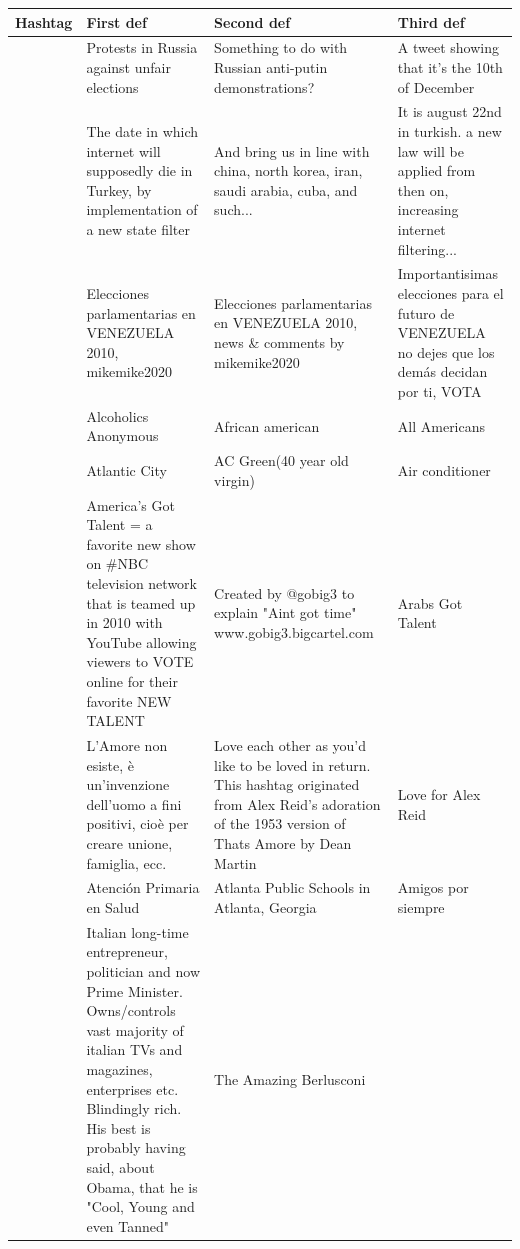 \documentclass[a4paper,11pt,oneside]{article}
\begin{document}
\begin{table}[h]
\label{tab:hashDef}
\centering
    \begin{tabular}{ | l | p{4cm} | p{4cm} | p{4cm} |}
    \hline
Hashtag & First def & Second def & Third def \\ \hline
\raisebox{-1mm}{10dec} & \small{Protests in Russia against unfair elections} & \small{Something to do with Russian anti-putin demonstrations?} & \small{A tweet showing that it's the 10th of December}\\
\raisebox{-1mm}{22agustos} & \small{The date in which internet will supposedly die in Turkey, by implementation of a new state filter} & \small{And bring us in line with china, north korea, iran, saudi arabia, cuba, and such...} & \small{It is august 22nd in turkish. a new law will be applied from then on, increasing internet filtering...}\\
\raisebox{-1mm}{26s} & \small{Elecciones parlamentarias en VENEZUELA 2010, mikemike2020} & \small{Elecciones parlamentarias en VENEZUELA 2010, news \& comments by mikemike2020} & \small{Importantisimas elecciones para el futuro de VENEZUELA no dejes que los demás decidan por ti, VOTA}\\
\raisebox{-1mm}{aa} & \small{Alcoholics Anonymous} & \small{African american } & \small{All Americans}\\
\raisebox{-1mm}{ac} & \small{Atlantic City} & \small{AC Green(40 year old virgin)} &  \small{Air conditioner}\\
\raisebox{-1mm}{agt} & \small{America's Got Talent = a favorite new show on \#NBC television network that is teamed up in 2010 with YouTube allowing viewers to VOTE online for their favorite NEW TALENT} & \small{Created by @gobig3 to explain "Aint got time"   www.gobig3.bigcartel.com} & \small{Arabs Got Talent}\\
\raisebox{-1mm}{amore} & \small{L'Amore non esiste, è un'invenzione dell'uomo a fini positivi, cioè per creare unione, famiglia, ecc. } & \small{Love each other as you'd like to be loved in return. This hashtag originated from Alex Reid's adoration of the 1953 version of Thats Amore by Dean Martin} & \small{Love for Alex Reid}\\
\raisebox{-1mm}{aps} & \small{Atención Primaria en Salud} & \small{Atlanta Public Schools in Atlanta, Georgia} & \small{Amigos por siempre}\\
\raisebox{-1mm}{berlusconi} & \small{Italian long-time entrepreneur, politician and now Prime Minister. Owns/controls vast majority of italian TVs and magazines, enterprises etc. Blindingly rich. His best is probably having said, about Obama, that he is "Cool, Young and even Tanned"} & \small{The Amazing Berlusconi} & \small{}\\

\end{tabular}
\end{table}
\end{document}

